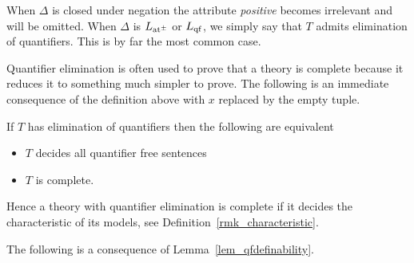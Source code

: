 
When $\Delta$ is closed under negation the attribute \textit{positive\/} becomes irrelevant and will be omitted. When $\Delta$ is $L_{\rm at^{\scriptscriptstyle\pm}}$ or $L_{\rm qf}$, we simply say that $T$ admits elimination of quantifiers. This is by far the most common case.

Quantifier elimination is often used to prove that a theory is complete because it reduces it to something much simpler to prove. The following is an immediate consequence of the definition above with $x$ replaced by the empty tuple.

\begin{remark}
If $T$ has elimination of quantifiers then the following are equivalent 
\begin{itemize}
\item[1.] $T$ decides all quantifier free sentences
\item[2.] $T$ is complete.\smallskip
\end{itemize}
Hence a theory with quantifier elimination is complete if it decides the characteristic of its models, see Definition~\ref{rmk_characteristic}.
\end{remark}


The following is a consequence of Lemma~\ref{lem_qfdefinability}.

